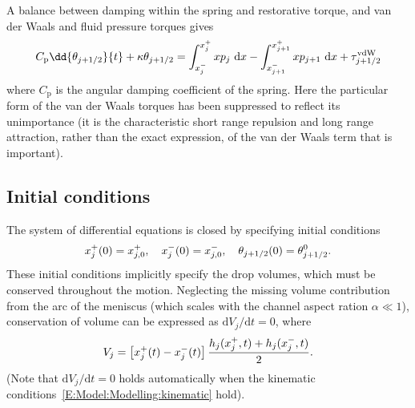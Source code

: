 A balance between damping within the spring and restorative torque, and van der Waals and fluid pressure torques gives
\begin{equation}\label{E:Model:Modelling:torqueBalance}
C_{\text{p}}\dd{\theta_{j+1/2}}{t} + \kappa \theta_{j+1/2}=\int^{\xrightj}_{\xleftj} x p_{j}~\mathrm{d}x -  \int^{\xrightjj}_{\xleftjj} x p_{j+1}~\mathrm{d}x + \tau^{\text{vdW}}_{j+1/2}
\end{equation}
where $C_{\text{p}}$ is the angular damping coefficient of the spring. Here  the particular form of the van der Waals torques has been  suppressed to reflect its unimportance (it is the characteristic short range repulsion and long range attraction, rather than the exact expression, of the van der Waals term that is important).

\subsection{Initial conditions}\label{S:Model:InitialConditions}
The system of differential equations is closed by specifying initial conditions
\begin{equation}\label{E:Model:Modelling:InitialConditions}
x_{j}^{+}(0) = x_{j,0}^{+}, \quad x_{j}^{-}(0) = x_{j,0}^{-}, \quad \theta_{j+1/2}(0) = \theta_{j+1/2}^0.
\end{equation}
These initial conditions implicitly specify the drop volumes, which must be conserved throughout the motion. Neglecting the missing volume contribution from the arc of the meniscus (which scales with the channel aspect ration $\alpha \ll 1$), conservation of volume can be expressed as $\mathrm{d}V_j/\mathrm{d}t = 0$, where
\begin{equation}\label{E:Model:Modelling:Volumes}
V_j = \left[x_{j}^{+}(t) - x_{j}^{-}(t)\right]\frac{h_j(x_{j}^{+},t) + h_j(x_{j}^{-},t)}{2}.
\end{equation}
(Note that $\mathrm{d}V_j/\mathrm{d}t = 0$ holds automatically when the kinematic conditions~\eqref{E:Model:Modelling:kinematic} hold).
